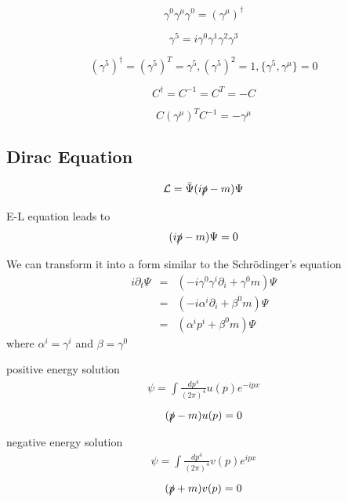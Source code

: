 \documentclass[12pt]{book}
\begin{document}
\begin{equation}
	\gamma^0\gamma^\mu\gamma^0=(\gamma^\mu)^\dagger
\end{equation}

\begin{equation}
	\gamma^5=i\gamma^0\gamma^1\gamma^2\gamma^3
\end{equation}

\begin{equation}
	(\gamma^5)^\dagger=(\gamma^5)^T=\gamma^5,(\gamma^5)^2=1,\{\gamma^5,\gamma^\mu\}=0
\end{equation}

\begin{equation}
	C^\dagger=C^{-1}=C^T=-C
\end{equation}

\begin{equation}
	C(\gamma^\mu)^TC^{-1}=-\gamma^\mu
\end{equation}

\subsection{Dirac Equation}

\begin{equation}
	\mathcal L= \bar\Psi(i\slashed p -m)\Psi
\end{equation}

E-L equation leads to 
\begin{equation}
	(i\slashed p -m)\Psi=0
\end{equation}

We can transform it into a form similar to the Schr\"odinger's equation
\begin{eqnarray}
	i\partial_t\Psi&=&(-i\gamma^0\gamma^i\partial_i+\gamma^0m)\Psi\\
	&=&(-i\alpha^i\partial_i+\beta^0m)\Psi\\
	&=&(\alpha^ip^i+\beta^0m)\Psi
\end{eqnarray}
where $\alpha^i=\gamma^i$ and $\beta=\gamma^0$

positive energy solution
\begin{eqnarray}
	\psi=\int \frac{dp^4}{(2\pi)^4} u(p) e^{-ipx}
\end{eqnarray}
\begin{equation}
	(\slashed p -m)u(p)=0
\end{equation}

negative energy solution
\begin{eqnarray}
	\psi=\int \frac{dp^4}{(2\pi)^4} v(p) e^{ipx}
\end{eqnarray}
\begin{equation}
	(\slashed p +m)v(p)=0
\end{equation}
\end{document}
